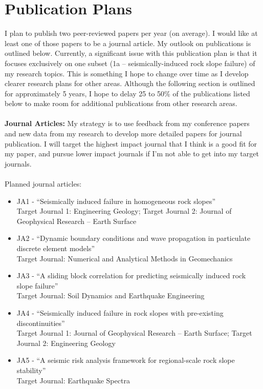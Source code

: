 \documentclass[10pt,letterpaper]{article}
\begin{document}
\section{Publication Plans}
I plan to publish two peer-reviewed papers per year (on average).
I would like at least one of those papers to be a journal article. 
My outlook on publications is outlined below.
Currently, a significant issue with this publication plan is that it focuses exclusively on one subset (1a -- seismically-induced rock slope failure) of my research topics.
This is something I hope to change over time as I develop clearer research plans for other areas. 
Although the following section is outlined for approximately 5 years, I hope to delay 25 to 50\% of the publications listed below to make room for additional publications from other research areas.
\\
\\
\noindent \textbf{Journal Articles:} My strategy is to use feedback from my conference papers and new data from my research to develop more detailed papers for journal publication. 
I will target the highest impact journal that I think is a good fit for my paper, and pursue lower impact journals if I'm not able to get into my target journals.
\\
\\
\noindent Planned journal articles:
\begin{itemize}
\item JA1 - ``Seismically induced failure in homogeneous rock slopes''
\\Target Journal 1: Engineering Geology; Target Journal 2: Journal of Geophysical Research -- Earth Surface
\item JA2 - ``Dynamic boundary conditions and wave propagation in particulate discrete element models''
\\Target Journal: Numerical and Analytical Methods in Geomechanics
\item JA3 - ``A sliding block correlation for predicting seismically induced rock slope failure''
\\ Target Journal: Soil Dynamics and Earthquake Engineering
\item JA4 - ``Seismically induced failure in rock slopes with pre-existing discontinuities''
\\ Target Journal 1: Journal of Geophysical Research -- Earth Surface; Target Journal 2: Engineering Geology
\item JA5 - ``A seismic risk analysis framework for regional-scale rock slope stability''
\\ Target Journal: Earthquake Spectra
\end{itemize}
\end{document}
